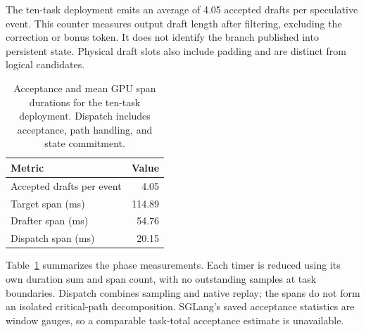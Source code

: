 The ten-task deployment emits an average of 4.05 accepted drafts per speculative event. This counter measures output draft length after filtering, excluding the correction or bonus token. It does not identify the branch published into persistent state. Physical draft slots also include padding and are distinct from logical candidates.

\begin{table}[t]
\caption{Acceptance and mean GPU span durations for the ten-task deployment. Dispatch includes acceptance, path handling, and state commitment.}
\label{tab:recovered-telemetry}
\centering\small
\begin{tabular}{@{}lr@{}}
\toprule
Metric & Value \\
\midrule
Accepted drafts per event & 4.05 \\
Target span (ms) & 114.89 \\
Drafter span (ms) & 54.76 \\
Dispatch span (ms) & 20.15 \\
\bottomrule
\end{tabular}
\end{table}

Table~\ref{tab:recovered-telemetry} summarizes the phase measurements. Each timer is reduced using its own duration sum and span count, with no outstanding samples at task boundaries. Dispatch combines sampling and native replay; the spans do not form an isolated critical-path decomposition. SGLang's saved acceptance statistics are window gauges, so a comparable task-total acceptance estimate is unavailable.
